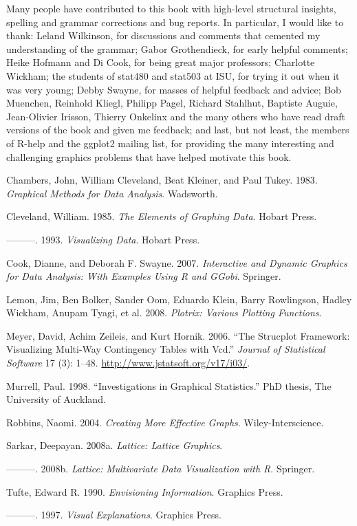 Many people have contributed to this book with high-level structural
insights, spelling and grammar corrections and bug reports. In
particular, I would like to thank: Leland Wilkinson, for discussions and
comments that cemented my understanding of the grammar; Gabor
Grothendieck, for early helpful comments; Heike Hofmann and Di Cook, for
being great major professors; Charlotte Wickham; the students of stat480
and stat503 at ISU, for trying it out when it was very young; Debby
Swayne, for masses of helpful feedback and advice; Bob Muenchen,
Reinhold Kliegl, Philipp Pagel, Richard Stahlhut, Baptiste Auguie,
Jean-Olivier Irisson, Thierry Onkelinx and the many others who have read
draft versions of the book and given me feedback; and last, but not
least, the members of R-help and the ggplot2 mailing list, for providing
the many interesting and challenging graphics problems that have helped
motivate this book.

Chambers, John, William Cleveland, Beat Kleiner, and Paul Tukey. 1983.
\emph{Graphical Methods for Data Analysis}. Wadsworth.

Cleveland, William. 1985. \emph{The Elements of Graphing Data}. Hobart
Press.

---------. 1993. \emph{Visualizing Data}. Hobart Press.

Cook, Dianne, and Deborah F. Swayne. 2007. \emph{Interactive and Dynamic
Graphics for Data Analysis: With Examples Using R and GGobi}. Springer.

Lemon, Jim, Ben Bolker, Sander Oom, Eduardo Klein, Barry Rowlingson,
Hadley Wickham, Anupam Tyagi, et al. 2008. \emph{Plotrix: Various
Plotting Functions}.

Meyer, David, Achim Zeileis, and Kurt Hornik. 2006. ``The Strucplot
Framework: Visualizing Multi-Way Contingency Tables with Vcd.''
\emph{Journal of Statistical Software} 17 (3): 1--48.
\url{http://www.jstatsoft.org/v17/i03/}.

Murrell, Paul. 1998. ``Investigations in Graphical Statistics.''
PhD thesis, The University of Auckland.

Robbins, Naomi. 2004. \emph{Creating More Effective Graphs}.
Wiley-Interscience.

Sarkar, Deepayan. 2008a. \emph{Lattice: Lattice Graphics}.

---------. 2008b. \emph{Lattice: Multivariate Data Visualization with
R}. Springer.

Tufte, Edward R. 1990. \emph{Envisioning Information}. Graphics Press.

---------. 1997. \emph{Visual Explanations}. Graphics Press.


